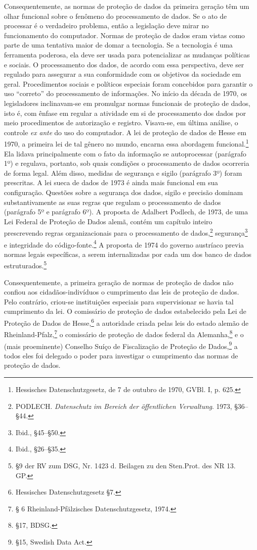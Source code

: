 Consequentemente, as normas de proteção de dados da primeira geração têm
um olhar funcional sobre o fenômeno do processamento de dados. Se o ato
de processar é o verdadeiro problema, então a legislação deve mirar no
funcionamento do computador. Normas de proteção de dados eram vistas
como parte de uma tentativa maior de domar a tecnologia. Se a tecnologia
é uma ferramenta poderosa, ela deve ser usada para potencializar as
mudanças políticas e sociais. O processamento dos dados, de acordo com
essa perspectiva, deve ser regulado para assegurar a sua conformidade
com os objetivos da sociedade em geral. Procedimentos sociais e
políticos especiais foram concebidos para garantir o uso ``correto'' do
processamento de informações. No início da década de 1970, os
legisladores inclinavam-se em promulgar normas funcionais de proteção de
dados, isto é, com ênfase em regular a atividade em si de processamento
dos dados por meio procedimentos de autorização e registro. Visava-se,
em última análise, o controle \emph{ex ante} do uso do computador. A lei
de proteção de dados de Hesse em 1970, a primeira lei de tal gênero no
mundo, encarna essa abordagem funcional.\footnote{Hessisches
  Datenschutzgesetz, de 7 de outubro de 1970, GVBl. I, p. 625.} Ela
lidava principalmente com o fato da informação se autoprocessar
(parágrafo 1º) e regulava, portanto, sob quais condições o processamento
de dados ocorreria de forma legal. Além disso, medidas de segurança e
sigilo (parágrafo 3º) foram prescritas. A lei sueca de dados de 1973 é
ainda mais funcional em sua configuração. Questões sobre a segurança dos
dados, sigilo e precisão dominam substantivamente as suas regras que
regulam o processamento de dados (parágrafo 5º e parágrafo 6º). A
proposta de Adalbert Podlech, de 1973, de uma Lei Federal de Proteção de
Dados alemã, contém um capítulo inteiro prescrevendo regras
organizacionais para o processamento de dados,\footnote{PODLECH.
  \emph{Datenschutz im Bereich der öffentlichen Verwaltung}. 1973,
  §36--§44.} segurança\footnote{Ibid., §45--§50.} e integridade do
código-fonte.\footnote{Ibid., §26--§35.} A proposta de 1974 do governo
austríaco previa normas legais específicas, a serem internalizadas por
cada um dos banco de dados estruturados.\footnote{§9 der RV zum DSG, Nr.
  1423 d. Beilagen zu den Sten.Prot. des NR 13. GP.}

Consequentemente, a primeira geração de normas de proteção de dados não
confiou aos cidadãos-indivíduos o cumprimento das leis de proteção de
dados. Pelo contrário, criou-se instituições especiais para
supervisionar se havia tal cumprimento da lei. O comissário de proteção
de dados estabelecido pela Lei de Proteção de Dados de Hesse,\footnote{Hessisches
  Datenschutzgesetz §7.} a autoridade criada pelas leis do estado alemão
de Rheinland-Pfalz,\footnote{§ 6 Rheinland-Pfälzisches
  Datenschutzgesetz, 1974.} o comissário de proteção de dados federal da
Alemanha,\footnote{§17, BDSG.} e o (mais proeminente) Conselho Suíço de
Fiscalização de Proteção de Dados,\footnote{§15, Swedish Data Act.} a
todos eles foi delegado o poder para investigar o cumprimento das normas
de proteção de dados.

